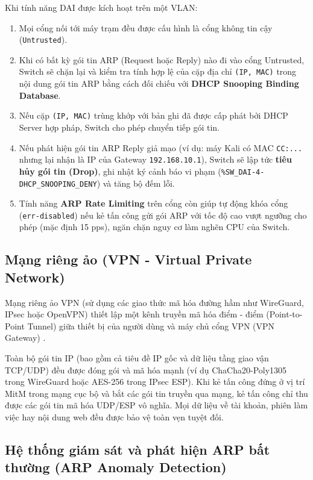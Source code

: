 Khi tính năng DAI được kích hoạt trên một VLAN:
\begin{enumerate}
  \item Mọi cổng nối tới máy trạm đều được cấu hình là cổng không tin cậy (\texttt{Untrusted}).
  \item Khi có bất kỳ gói tin ARP (Request hoặc Reply) nào đi vào cổng Untrusted, Switch sẽ chặn lại và kiểm tra tính hợp lệ của cặp địa chỉ \texttt{(IP, MAC)} trong nội dung gói tin ARP bằng cách đối chiếu với \textbf{DHCP Snooping Binding Database}.
  \item Nếu cặp \texttt{(IP, MAC)} trùng khớp với bản ghi đã được cấp phát bởi DHCP Server hợp pháp, Switch cho phép chuyển tiếp gói tin.
  \item Nếu phát hiện gói tin ARP Reply giả mạo (ví dụ: máy Kali có MAC \texttt{CC:...} nhưng lại nhận là IP của Gateway \texttt{192.168.10.1}), Switch sẽ lập tức \textbf{tiêu hủy gói tin (Drop)}, ghi nhật ký cảnh báo vi phạm (\texttt{\%SW\_DAI-4-DHCP\_SNOOPING\_DENY}) và tăng bộ đếm lỗi.
  \item Tính năng \textbf{ARP Rate Limiting} trên cổng còn giúp tự động khóa cổng (\texttt{err-disabled}) nếu kẻ tấn công gửi gói ARP với tốc độ cao vượt ngưỡng cho phép (mặc định 15 pps), ngăn chặn nguy cơ làm nghẽn CPU của Switch.
\end{enumerate}

\subsection{Mạng riêng ảo (VPN - Virtual Private Network)}

Mạng riêng ảo VPN (sử dụng các giao thức mã hóa đường hầm như WireGuard, IPsec hoặc OpenVPN) thiết lập một kênh truyền mã hóa điểm - điểm (Point-to-Point Tunnel) giữa thiết bị của người dùng và máy chủ cổng VPN (VPN Gateway) \cite{stallings2023crypto}.

Toàn bộ gói tin IP (bao gồm cả tiêu đề IP gốc và dữ liệu tầng giao vận TCP/UDP) đều được đóng gói và mã hóa mạnh (ví dụ ChaCha20-Poly1305 trong WireGuard hoặc AES-256 trong IPsec ESP). Khi kẻ tấn công đứng ở vị trí MitM trong mạng cục bộ và bắt các gói tin truyền qua mạng, kẻ tấn công chỉ thu được các gói tin mã hóa UDP/ESP vô nghĩa. Mọi dữ liệu về tài khoản, phiên làm việc hay nội dung web đều được bảo vệ toàn vẹn tuyệt đối.

\subsection{Hệ thống giám sát và phát hiện ARP bất thường (ARP Anomaly Detection)}

